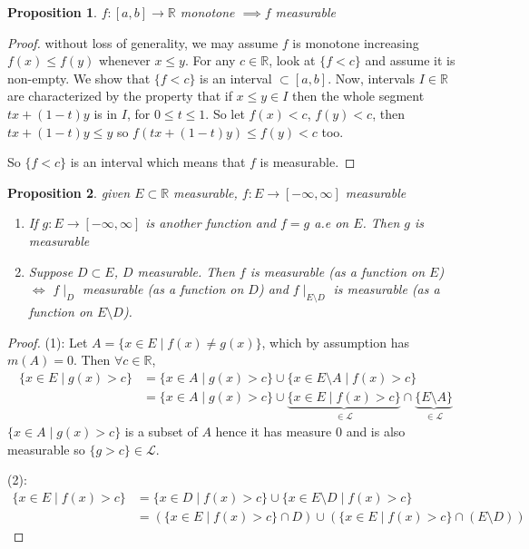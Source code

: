 \documentclass[11pt]{article}
\newtheorem*{prop}{Proposition}
\newcommand{\R}{\mathbb{R}}
\newcommand{\Le}{\mathcal{L}}
\begin{document}
    \begin{prop}
        $f: [a,b] \rightarrow \R$ monotone $\implies f$ measurable
    \end{prop}

    \begin{proof}
        without loss of generality, we may assume $f$ is monotone increasing $f(x) \leq f(y)$ whenever $x \leq y$.
        For any $c \in \R$, look at $\{ f < c \}$ and assume it is non-empty.
        We show that $\{ f < c \}$ is an interval $\subset [a,b]$.
        Now, intervals $I \in \R$ are characterized by the property that if $x \leq y \in I$ then the whole segment $tx + (1-t)y$ is in $I$, for $0 \leq t \leq 1$.
        So let $f(x) < c$, $f(y) < c$, then $tx + (1-t)y \leq y$ so $f(tx + (1-t)y) \leq f(y) < c$ too.

        So $\{ f < c\}$ is an interval which means that $f$ is measurable.
    \end{proof}

    \begin{prop}
        given $E \subset \R$ measurable, $f: E \rightarrow [-\infty, \infty]$ measurable
        \begin{enumerate}
            \item If $g: E \rightarrow [-\infty, \infty]$ is another function and $f=g$ a.e on $E$.
            Then $g$ is measurable
            \item Suppose $D \subset E$, $D$ measurable.
            Then $f$ is measurable (as a function on $E$) $\iff$ $f\mid_{D}$ measurable (as a function on $D$) and $f \mid_{E \setminus D}$ is measurable (as a function on $E \setminus D$).
        \end{enumerate}
    \end{prop}

    \begin{proof}
    (1): Let $A = \{ x \in E \mid f(x) \ne g(x) \}$, which by assumption has $m(A) = 0$.
        Then $\forall c \in \R$,
        \begin{align*}
            \{ x \in E \mid g(x) > c \} &= \{ x \in A \mid g(x) > c \} \cup \{ x \in E \setminus A \mid f(x) > c \} \\
            &= \{ x \in A \mid g(x) > c \} \cup \underbrace{\{ x \in E\mid f(x) > c \}}_{\in \Le} \cap \underbrace{\{ E \setminus A \}}_{\in \Le}
        \end{align*}
        $\{ x \in A \mid g(x) > c \}$ is a subset of $A$ hence it has measure 0 and is also measurable so $\{ g > c \} \in \Le$.

    (2): \begin{align*}
             \{ x \in E \mid f(x) > c \} &= \{ x \in D \mid f(x) > c \} \cup \{ x \in E \setminus D \mid f(x) > c \} \\
             &= ( \{ x \in E \mid f(x) > c \} \cap D) \cup (\{ x \in E \mid f(x) > c \} \cap (E \setminus D))
    \end{align*}
    \end{proof}
\end{document}
